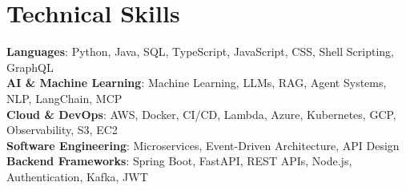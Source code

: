 \documentclass[letterpaper,11pt]{article}
\begin{document}
\section{Technical Skills}
 \begin{itemize}[leftmargin=0.15in, label={}]
    \small{\item{
     \textbf{Languages}{: Python, Java, SQL, TypeScript, JavaScript, CSS, Shell Scripting, GraphQL} \\
     \textbf{AI \& Machine Learning}{: Machine Learning, LLMs, RAG, Agent Systems, NLP, LangChain, MCP} \\
     \textbf{Cloud \& DevOps}{: AWS, Docker, CI/CD, Lambda, Azure, Kubernetes, GCP, Observability, S3, EC2} \\
     \textbf{Software Engineering}{: Microservices, Event-Driven Architecture, API Design} \\
     \textbf{Backend Frameworks}{: Spring Boot, FastAPI, REST APIs, Node.js, Authentication, Kafka, JWT} \\
    }}
 \end{itemize}
\end{document}
